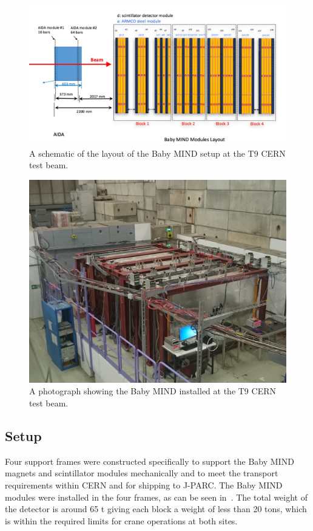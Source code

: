 \begin{figure}[h!]
\centering
\includegraphics[width=\textwidth]{figures/MINDAIDAtestbeam.jpeg}
\caption{A schematic of the layout of the Baby MIND setup at the T9 CERN test beam.}
\label{fig:MINDtb}
\end{figure}

\begin{figure}[h!]
\centering
\includegraphics[width=\textwidth]{figures/DSC_2619.JPG}
\caption{A photograph showing the Baby MIND installed at the T9 CERN test beam.}
\label{fig:MINDtbreal}
\end{figure}

\subsection{Setup}

Four support frames were constructed specifically to support the Baby MIND magnets and scintillator modules mechanically and to meet the transport requirements within CERN and for shipping to J-PARC. The Baby MIND modules were installed in the four frames, as can be seen in~. The total weight of the detector is around 65 t giving each block a weight of less than 20 tons, which is within the required limits for crane operations at both sites.

